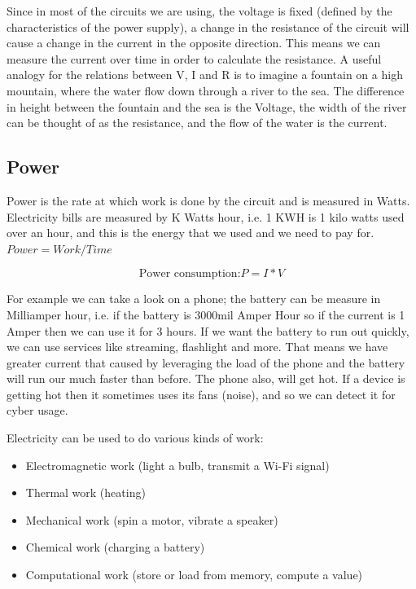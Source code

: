Since in most of the circuits we are using, the voltage is fixed (defined by the
characteristics of the power supply), a change in the resistance of the circuit
will cause a change in the current in the opposite direction. This means we can
measure the current over time in order to calculate the resistance. A useful
analogy for the relations between V, I and R is to imagine a fountain on a high
mountain, where the water flow down through a river to the sea. The difference
in height between the fountain and the sea is the Voltage, the width of the
river can be thought of as the resistance, and the flow of the water is the
current.

\subsection{Power}

Power is the rate at which work is done by the circuit and is measured in Watts.
Electricity bills are measured by K Watts hour, i.e. 1 KWH is 1 kilo watts used
over an hour, and this is the energy that we used and we need to pay for. $Power
= Work / Time$

\begin{displaymath}\label{eq:power_consumption}
    \textrm{Power consumption:} P=I*V
\end{displaymath}

For example we can take a look on a phone; the battery can be measure in
Milliamper hour, i.e. if the battery is 3000mil Amper Hour so if the current is
1 Amper then we can use it for 3 hours. If we want the battery to run out
quickly, we can use services like streaming, flashlight and more. That means we
have greater current that caused by leveraging the load of the phone and the
battery will run our much faster than before. The phone also, will get hot. If a
device is getting hot then it sometimes uses its fans (noise), and so we can
detect it for cyber usage.

Electricity can be used to do various kinds of work:
\begin{itemize}
    \item Electromagnetic work (light a bulb, transmit a Wi-Fi signal)
    \item Thermal work (heating)
    \item Mechanical work (spin a motor, vibrate a speaker)
    \item Chemical work (charging a battery)
    \item Computational work (store or load from memory, compute a value)
\end{itemize}

